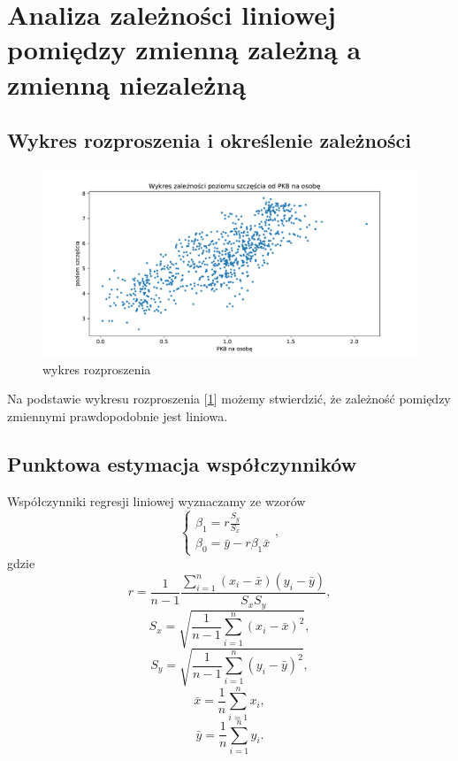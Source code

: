 \documentclass{article}
\theoremstyle{break}
\begin{document}
\section{Analiza zależności liniowej pomiędzy zmienną zależną a zmienną niezależną}

\subsection{Wykres rozproszenia i określenie zależności}

\begin{figure}[H]
	\begin{center}
		\includegraphics[scale=0.43]{plot1.pdf}
		\caption{wykres rozproszenia}
		\label{fig:rozproszenie}
	\end{center}
\end{figure}

Na podstawie wykresu rozproszenia [\ref{fig:rozproszenie}] możemy stwierdzić, że zależność pomiędzy zmiennymi prawdopodobnie jest liniowa.

\subsection{Punktowa estymacja współczynników}

Współczynniki regresji liniowej wyznaczamy ze wzorów
\begin{equation}
\left\{ \begin{array}{ll}
	\beta_{1} = r\frac{S_{y}}{S_{x}}\\
	\beta_{0} = \bar{y} - r\beta_{1}\bar{x}
\end{array} \right.,
\end{equation} gdzie
\begin{equation}
	r = \frac{1}{n-1}\frac{\sum_{i=1}^{n}(x_i-\bar{x})(y_i-\bar{y})}{S_{x}S_{y}},
\end{equation}
\begin{equation}
	S_{x} = \sqrt{\frac{1}{n-1}\sum_{i=1}^{n}(x_{i}-\bar{x})^{2}},
\end{equation}
\begin{equation}
	S_{y} = \sqrt{\frac{1}{n-1}\sum_{i=1}^{n}(y_{i}-\bar{y})^{2}},
\end{equation}
\begin{equation}
	\bar{x} = \frac{1}{n}\sum_{i=1}^{n}x_{i},
\end{equation}
\begin{equation}
	\bar{y} = \frac{1}{n}\sum_{i=1}^{n}y_{i}.
\end{equation}
\end{document}
